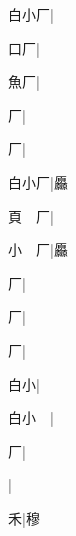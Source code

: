 \begin{multicols}{2}
{{\cjk{}白小厂}|{}\par
{\cjk{}{\cnsym{}　}口厂}|{}\par
{\cjk{}{\cnsym{}　}魚厂}|{}\par
{\cjk{}{\cnsym{}　}{\cnsym{}　}厂}|{}\par
{\cjk{}{\cnsym{}　}{\cnsym{}　}厂}|{}\par
{\cjk{}白小厂}|{\cjk{}厵}\par
{\cjk{}頁{\cnsym{}　}厂}|{}\par
{\cjk{}小{\cnsym{}　}厂}|{\cjk{}厵}\par
{\cjk{}{\cnsym{}　}{\cnsym{}　}厂}|{}\par
{\cjk{}{\cnsym{}　}{\cnsym{}　}厂}|{}\par
{\cjk{}{\cnsym{}　}{\cnsym{}　}厂}|{}\par
{\cjk{}{\cnsym{}　}白小}|{}\par
{\cjk{}白小{\cnsym{}　}}|{}\par
{\cjk{}{\cnsym{}　}{\cnsym{}　}厂}|{}\par
{\cjk{}{\cnsym{}　}{\cnsym{}　}{\cnsym{}　}}|{}\par
{\cjk{}{\cnsym{}　}{\cnsym{}　}禾}|{\cjk{}穆}\par
}
\end{multicols}
